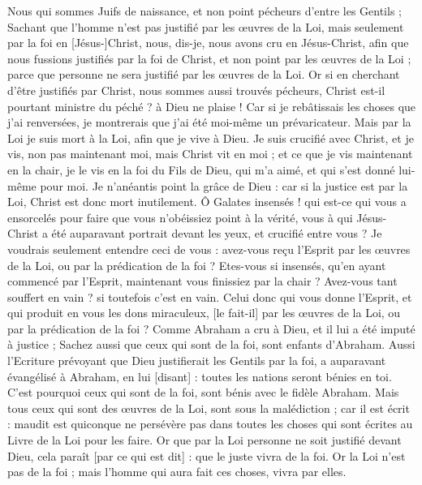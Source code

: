 \begin{multicols}{2}
Nous qui sommes Juifs de naissance, et non point pécheurs d'entre les Gentils ;
Sachant que l'homme n'est pas justifié par les œuvres de la Loi, mais seulement par la foi en [Jésus-]Christ, nous, dis-je, nous avons cru en Jésus-Christ, afin que nous fussions justifiés par la foi de Christ, et non point par les œuvres de la Loi ; parce que personne ne sera justifié par les œuvres de la Loi.
Or si en cherchant d'être justifiés par Christ, nous sommes aussi trouvés pécheurs, Christ est-il pourtant ministre du péché ? à Dieu ne plaise !
Car si je rebâtissais les choses que j'ai renversées, je montrerais que j'ai été moi-même un prévaricateur.
Mais par la Loi je suis mort à la Loi, afin que je vive à Dieu.
Je suis crucifié avec Christ, et je vis, non pas maintenant moi, mais Christ vit en moi ; et ce que je vis maintenant en la chair, je le vis en la foi du Fils de Dieu, qui m'a aimé, et qui s'est donné lui-même pour moi.
Je n'anéantis point la grâce de Dieu : car si la justice est par la Loi, Christ est donc mort inutilement.
\VerseOne{}Ô Galates insensés ! qui est-ce qui vous a ensorcelés pour faire que vous n'obéissiez point à la vérité, vous à qui Jésus-Christ a été auparavant portrait devant les yeux, et crucifié entre vous ?
Je voudrais seulement entendre ceci de vous : avez-vous reçu l'Esprit par les œuvres de la Loi, ou par la prédication de la foi ?
Etes-vous si insensés, qu'en ayant commencé par l'Esprit, maintenant vous finissiez par la chair ?
Avez-vous tant souffert en vain ? si toutefois c'est en vain.
Celui donc qui vous donne l'Esprit, et qui produit en vous les dons miraculeux, [le fait-il] par les œuvres de la Loi, ou par la prédication de la foi ?
Comme Abraham a cru à Dieu, et il lui a été imputé à justice ;
Sachez aussi que ceux qui sont de la foi, sont enfants d'Abraham.
Aussi l'Ecriture prévoyant que Dieu justifierait les Gentils par la foi, a auparavant évangélisé à Abraham, en lui [disant] : toutes les nations seront bénies en toi.
C'est pourquoi ceux qui sont de la foi, sont bénis avec le fidèle Abraham.
Mais tous ceux qui sont des œuvres de la Loi, sont sous la malédiction ; car il est écrit : maudit est quiconque ne persévère pas dans toutes les choses qui sont écrites au Livre de la Loi pour les faire.
Or que par la Loi personne ne soit justifié devant Dieu, cela paraît [par ce qui est dit] : que le juste vivra de la foi.
Or la Loi n'est pas de la foi ; mais l'homme qui aura fait ces choses, vivra par elles.

\end{multicols}
